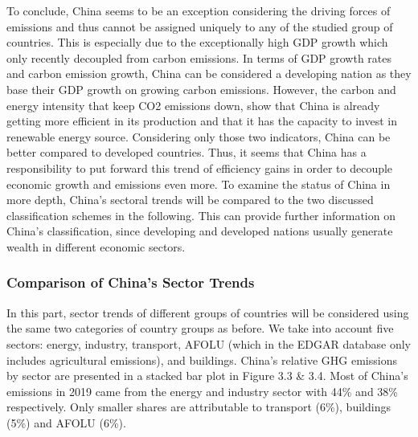 \documentclass[
  12pt,
]{article}
\numberwithin{equation}{section}
\numberwithin{table}{section}
\numberwithin{figure}{section}
\begin{document}
To conclude, China seems to be an exception considering the driving
forces of emissions and thus cannot be assigned uniquely to any of the
studied group of countries. This is especially due to the exceptionally
high GDP growth which only recently decoupled from carbon emissions. In
terms of GDP growth rates and carbon emission growth, China can be
considered a developing nation as they base their GDP growth on growing
carbon emissions. However, the carbon and energy intensity that keep CO2
emissions down, show that China is already getting more efficient in its
production and that it has the capacity to invest in renewable energy
source. Considering only those two indicators, China can be better
compared to developed countries. Thus, it seems that China has a
responsibility to put forward this trend of efficiency gains in order to
decouple economic growth and emissions even more. To examine the status
of China in more depth, China's sectoral trends will be compared to the
two discussed classification schemes in the following. This can provide
further information on China's classification, since developing and
developed nations usually generate wealth in different economic sectors.

\hypertarget{comparison-of-chinas-sector-trends}{%
\subsubsection{Comparison of China's Sector
Trends}\label{comparison-of-chinas-sector-trends}}

In this part, sector trends of different groups of countries will be
considered using the same two categories of country groups as before. We
take into account five sectors: energy, industry, transport, AFOLU
(which in the EDGAR database only includes agricultural emissions), and
buildings. China's relative GHG emissions by sector are presented in a
stacked bar plot in Figure 3.3 \& 3.4. Most of China's emissions in 2019
came from the energy and industry sector with 44\% and 38\%
respectively. Only smaller shares are attributable to transport (6\%),
buildings (5\%) and AFOLU (6\%).
\end{document}
